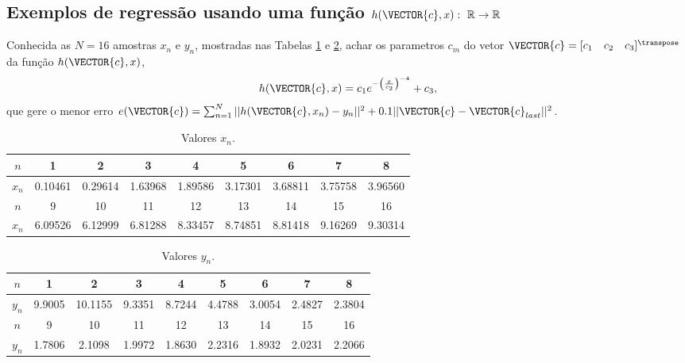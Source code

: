 \subsection{Exemplos de regressão usando uma função
$h(\VECTOR{c},x):~\mathbb{R} \rightarrow \mathbb{R}$}

\begin{example}\label{ex:theo:maphcxr1r1}
Conhecida as $N=16$ amostras $x_n$ e $y_n$, mostradas nas  Tabelas \ref{table:theo:maphcxr1r1:xn} e \ref{table:theo:maphcxr1r1:yn},
achar os parametros $c_m$ do vetor $\VECTOR{c}=[c_1\quad c_2\quad c_3]^{\transpose}$ da função $h(\VECTOR{c},x)$, 
\begin{equation}
h(\VECTOR{c},x)=c_1 e^{-\left(\frac{x}{c_2}\right)^{-4}}+c_3,
\end{equation}
que gere o menor erro 
$e(\VECTOR{c})= \sum_{n=1}^{N} ||h(\VECTOR{c},x_n)-y_n||^2 + 0.1 ||\VECTOR{c}-\VECTOR{c}_{last}||^2 $.
\end{example}


\begin{table}[h!]
\centering
\begin{tabular}{|c|c|c|c|c|c|c|c|c|} 
 \hline
$n$   & 1 & 2 & 3 & 4 & 5 & 6 & 7 & 8\\ \hline
$x_n$ & 0.10461 & 0.29614 & 1.63968 & 1.89586 & 3.17301 & 3.68811 & 3.75758 & 3.96560 \\ \hline
 \hline
$n$   & 9 & 10 & 11 & 12 & 13 & 14 & 15 & 16\\  \hline
$x_n$ & 6.09526 & 6.12999 & 6.81288 & 8.33457 & 8.74851 & 8.81418 & 9.16269 & 9.30314 \\ \hline
\end{tabular}
\caption{Valores $x_n$.}
\label{table:theo:maphcxr1r1:xn}
\end{table}

\begin{table}[h!]
\centering
\begin{tabular}{|c|c|c|c|c|c|c|c|c|} 
 \hline
$n$   & 1 & 2 & 3 & 4 & 5 & 6 & 7 & 8\\ \hline
$y_n$ & 9.9005 & 10.1155 & 9.3351 & 8.7244 & 4.4788 & 3.0054 & 2.4827 & 2.3804  \\ \hline
 \hline
$n$   & 9 & 10 & 11 & 12 & 13 & 14 & 15 & 16\\  \hline
$y_n$ & 1.7806 & 2.1098 & 1.9972 & 1.8630 & 2.2316 & 1.8932 & 2.0231 & 2.2066 \\ \hline
\end{tabular}
\caption{Valores $y_n$.}
\label{table:theo:maphcxr1r1:yn}
\end{table}

